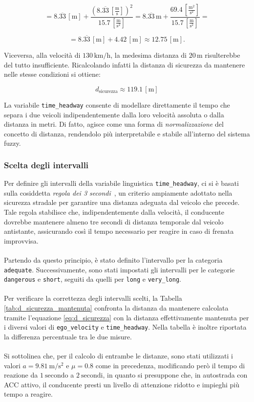 \[
= 8.\overline{33}\,\mathrm{[m]} 
+ \frac{(8.\overline{33}\,\mathrm{\left[\tfrac{m}{s}\right]})^2}{15.7\,\mathrm{\left[\tfrac{m}{s^2}\right]}}
= 8.\overline{33}\,\mathrm{m} + \frac{69.4\,\left[{\frac{\mathrm{m^2}}{\mathrm{s^2}}}\right]}{15.7\,\left[{\frac{\mathrm{m}}{\mathrm{s^2}}}\right]} =
\]

\[
= 8.\overline{33}\,\mathrm{[m]} + 4.42\,\mathrm{[m]} 
\approx 12.75\,\mathrm{[m]}.
\]

\noindent Viceversa, alla velocità di \(130\,\mathrm{km/h}\), la medesima distanza di \(20\,\mathrm{m}\) risulterebbe del tutto insufficiente. 
Ricalcolando infatti la distanza di sicurezza da mantenere nelle stesse condizioni si ottiene:

\[
d_{\mathrm{sicurezza}} \approx 119.1\,\mathrm{[m]}
\]

\noindent La variabile \texttt{time\_headway} consente di modellare direttamente il tempo che separa i due veicoli 
indipendentemente dalla loro velocità assoluta o dalla distanza in metri. Di fatto, agisce come una forma di 
\emph{normalizzazione} del concetto di distanza, rendendolo più interpretabile e stabile all'interno del sistema fuzzy.

\subsubsection{Scelta degli intervalli} 
Per definire gli intervalli della variabile linguistica \texttt{time\_headway}, 
ci si è basati sulla cosiddetta \emph{regola dei 3 secondi}~\cite{benzinazero2016}, 
un criterio ampiamente adottato nella sicurezza stradale per garantire una distanza adeguata dal veicolo che precede. 
Tale regola stabilisce che, indipendentemente dalla velocità, il conducente dovrebbe mantenere almeno tre secondi di distanza 
temporale dal veicolo antistante, assicurando così il tempo necessario per reagire in caso di frenata improvvisa. 
\\\\
\noindent Partendo da questo principio, è stato definito l'intervallo per la categoria \texttt{adequate}. 
Successivamente, sono stati impostati gli intervalli per le categorie \texttt{dangerous} e \texttt{short}, 
seguiti da quelli per \texttt{long} e \texttt{very\_long}. 
\\\\
\noindent Per verificare la correttezza degli intervalli scelti, la Tabella \ref{tab:d_sicurezza_mantenuta} 
confronta la distanza da mantenere calcolata tramite l'equazione \ref{eq:d_sicurezza} con la distanza effettivamente mantenuta 
per i diversi valori di \texttt{ego\_velocity} e \texttt{time\_headway}. 
Nella tabella è inoltre riportata la differenza percentuale tra le due misure. 
\\\\
\noindent Si sottolinea che, per il calcolo di entrambe le distanze, sono stati utilizzati i valori $a = 9.81~\mathrm{m/s^2}$ 
e $\mu = 0.8$ come in precedenza, modificando però il tempo di reazione da $1~\mathrm{secondo}$ a $2~\mathrm{secondi}$, 
in quanto si presuppone che, in autostrada con ACC attivo, il conducente presti un livello di attenzione ridotto e impieghi
più tempo a reagire.

